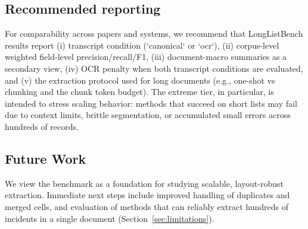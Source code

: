 \subsection{Recommended reporting}
For comparability across papers and systems, we recommend that LongListBench results report (i) transcript condition (`canonical` or `ocr`), (ii) corpus-level weighted field-level precision/recall/F1, (iii) document-macro summaries as a secondary view, (iv) OCR penalty when both transcript conditions are evaluated, and (v) the extraction protocol used for long documents (e.g., one-shot vs chunking and the chunk token budget). The extreme tier, in particular, is intended to stress scaling behavior: methods that succeed on short lists may fail due to context limits, brittle segmentation, or accumulated small errors across hundreds of records.

\subsection{Future Work}
We view the benchmark as a foundation for studying scalable, layout-robust extraction. Immediate next steps include improved handling of duplicates and merged cells, and evaluation of methods that can reliably extract hundreds of incidents in a single document (Section~\ref{sec:limitations}).
